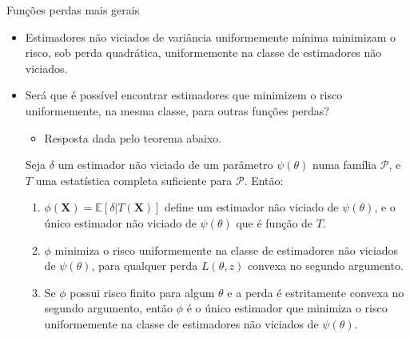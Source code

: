 \documentclass[11pt]{beamer}
\begin{document}
	\begin{frame}{Funções perdas mais gerais}
	\begin{itemize}
		\item Estimadores não viciados de variância uniformemente mínima minimizam o risco, sob perda quadrática, uniformemente na classe de estimadores não viciados.
		\item Será que é possível encontrar estimadores que minimizem o risco uniformemente, na mesma classe, para outras funções perdas?
		\begin{itemize}
			\item Resposta dada pelo teorema abaixo.
		\end{itemize}
		

		
		\begin{theorem}
			Seja $\delta$ um estimador não viciado de um parâmetro $\psi(\theta)$ numa família $\mathcal{P}$, e $T$ uma estatística completa suficiente para $\mathcal{P}$. Então:
			\begin{enumerate}
				\item $\phi(\boldsymbol{X}) = \mathbb{E}[\delta|T(\boldsymbol{X})]$ define um estimador não viciado de $\psi(\theta)$, e o único estimador não viciado de $\psi(\theta)$ que é função de $T$.
				\item $\phi$ minimiza o risco uniformemente na classe de estimadores não viciados de $\psi(\theta)$, para qualquer perda $L(\theta,z)$ convexa no segundo argumento.
				\item Se $\phi$ possui risco finito para algum $\theta$ e a perda é estritamente convexa no segundo argumento, então $\phi$ é o único estimador que minimiza o risco uniformemente  na classe de estimadores não viciados de $\psi(\theta)$.
			\end{enumerate}
		\end{theorem}
	\end{itemize}
	\end{frame}
	
\end{document}
